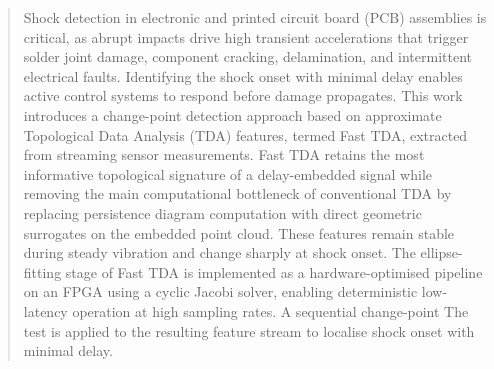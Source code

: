 \documentclass[colorlinks,upint,subscriptcorrection,varvw,hyphenate,balance,greek,russian,vietnamese,german]{asmeconf} %
\begin{document}

\maketitle






\begin{abstract}
Shock detection in electronic and printed circuit board (PCB) assemblies
is critical, as abrupt impacts drive high transient accelerations that
trigger solder joint damage, component cracking, delamination, and
intermittent electrical faults. Identifying the shock onset with minimal
delay enables active control systems to respond before damage propagates.
This work introduces a change-point detection approach based on
approximate Topological Data Analysis (TDA) features, termed Fast TDA,
extracted from streaming sensor measurements. Fast TDA retains the most
informative topological signature of a delay-embedded signal while
removing the main computational bottleneck of conventional TDA by
replacing persistence diagram computation with direct geometric
surrogates on the embedded point cloud. These features remain stable
during steady vibration and change sharply at shock onset. The
ellipse-fitting stage of Fast TDA is implemented as a hardware-optimised
pipeline on an FPGA using a cyclic Jacobi solver, enabling deterministic
low-latency operation at high sampling rates. A sequential change-point
The test is applied to the resulting feature stream to localise shock onset
with minimal delay.
\end{abstract}
\end{document}
